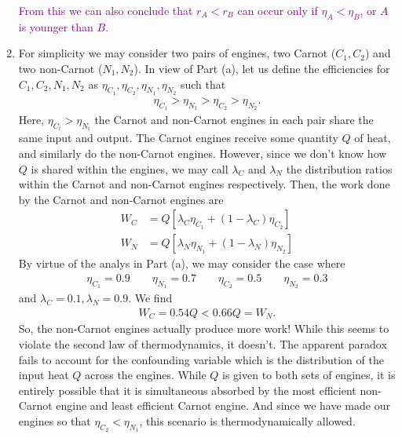 \documentclass{article}
\theoremstyle{definition}
\begin{document}
\begin{enumerate}[label=(\alph*)]
	\textcolor{purple}{From this we can also  conclude that $r_A < r_B$ can occur only if $\eta_A < \eta_B  $, or $A$ is younger than $B$. }
	
	
	
	\item For simplicity we may consider two pairs of engines, two Carnot ($C_1,C_2$) and two non-Carnot ($N_1, N_2$). In view of Part (a), let us define the efficiencies for $C_1,C_2,N_1,N_2$ as $\eta_{C_1}, \eta_{C_2}, \eta_{N_1}, \eta_{N_2}$ such that 
	\begin{align*}
	\eta_{C_1} > \eta_{N_1} >  \eta_{C_2} > \eta_{N_2}.
	\end{align*}
	Here, $\eta_{C_i} > \eta_{N_i}$ the Carnot and non-Carnot engines in each pair share the same input and output. The Carnot engines receive some quantity $Q$ of heat, and similarly do the non-Carnot engines. However, since we don't know how $Q$ is shared within the engines, we may call $\lambda_C$ and $\lambda_N$ the distribution ratios within the Carnot and non-Carnot engines respectively. Then, the work done by the Carnot and non-Carnot engines are
	\begin{align*}
	W_C &= Q  [ \lambda_C \eta_{C_1} + (1-\lambda_C) \eta_{C_2}] \\
	W_N &= Q  [ \lambda_N \eta_{N_1} + (1-\lambda_N) \eta_{N_2}]
	\end{align*}
	By virtue of the analys in Part (a), we may consider the case where 
	\begin{align*}
	\eta_{C_1} = 0.9 \quad\quad \eta_{N_1} = 0.7 \quad\quad \eta_{C_2} = 0.5\quad\quad \eta_{N_2} = 0.3
	\end{align*}
	and $\lambda_C = 0.1, \lambda_N = 0.9$. We find
	\begin{align*}
	W_C = 0.54 Q < 0.66 Q = W_N. 
	\end{align*}
	So, the non-Carnot engines actually produce more work! While this seems to violate the second law of thermodynamics, it doesn't. The apparent paradox fails to account for the confounding variable which is the distribution of the input heat $Q$ across the engines. While $Q$ is given to both sets of engines, it is entirely possible that it is simultaneous absorbed by the most efficient non-Carnot engine and least efficient Carnot engine. And since we have made our engines so that $\eta_{C_2} < \eta_{N_1}$, this scenario is thermodynamically allowed. 
\end{enumerate}

 
\end{document}
